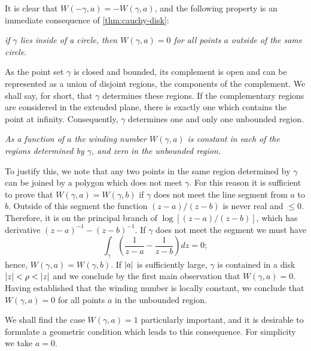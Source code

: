 It is clear that $W(-\gamma, a)=-W(\gamma, a)$, and the following property is an immediate consequence of \ref{thm:cauchy-disk}:

\textit{if $\gamma$ lies inside of a circle, then $W(\gamma,a)=0$ for all points $a$ outside of the same circle}.

As the point set $\gamma$ is closed and bounded, its complement is open and can be represented as a union of disjoint regions, the components of the complement. We shall say, for short, that $\gamma$ determines these regions. If the complementary regions are considered in the extended plane, there is exactly one which contains the point at infinity. Consequently, $\gamma$ determines one and only one unbounded region.

\textit{As a function of $a$ the winding number $W(\gamma, a)$ is constant in each of the regions determined by $\gamma$, and zero in the unbounded region.}

To justify this, we note that any two points in the same region determined by $\gamma$ can be joined by a polygon which does not meet $\gamma$. For this reason it is sufficient to prove that $W(\gamma, a)=W(\gamma,b)$ if $\gamma$ does not meet the line segment from $a$ to $b$. Outside of this segment the function $(z-a)/(z-b)$ is never real and $\le 0$. Therefore, it is on the principal branch of $\log \left[(z-a)/(z-b)\right]$, which has derivative $(z-a)^{-1}-(z-b)^{-1}$. If $\gamma$ does not meet the segment we must have $$\int_{\gamma} \left(\dfrac{1}{z-a}-\dfrac{1}{z-b}\right)dz=0;$$ hence, $W(\gamma, a)=W(\gamma,b)$. If $\lvert a \rvert$ is sufficiently large, $\gamma$ is contained in a disk $\lvert z \rvert<\rho<\lvert z \rvert$ and we conclude by the first main observation that $W(\gamma, a)=0$. Having established that the winding number is locally constant, we conclude that $W(\gamma,a)=0$ for all points $a$ in the unbounded region.

We shall find the case $W(\gamma, a)=1$ particularly important, and it is desirable to formulate a geometric condition which leads to this consequence. For simplicity we take $a=0$.
